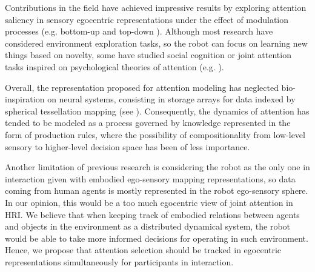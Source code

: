 \documentclass[letterpaper, 10 pt, conference]{ieeeconf}  %
\begin{document}

	Contributions in the field have achieved impressive results by exploring attention saliency in sensory egocentric representations under the effect of modulation processes (e.g. bottom-up \cite{ruesch2008} and top-down \cite{bodiroza2011}). Although most research have considered environment exploration tasks, so the robot can focus on learning new things based on novelty, some have studied social cognition or joint attention tasks inspired on psychological theories of attention (e.g. \cite{ruesch2008}). 
	
	Overall, the representation proposed for attention modeling has neglected bio-inspiration on neural systems, consisting in storage arrays for data indexed by spherical tessellation mapping (see \cite{peters2009sensory}). Consequently, the dynamics of attention has tended to be modeled as a process governed by knowledge represented in the form of production rules, where the possibility of compositionality from low-level sensory to higher-level decision space has been of less importance. 
	
	
	
	
	Another limitation of previous research is considering the robot as the only one in interaction given with embodied ego-sensory mapping representations, so data coming from human agents is mostly represented in the robot ego-sensory sphere. In our opinion, this would be a too much egocentric view of joint attention in HRI. We believe that when keeping track of embodied relations between agents and objects in the environment as a distributed dynamical system, the robot would be able to take more informed decisions for operating in such environment. Hence, we propose that attention selection should be tracked in egocentric representations simultaneously for participants in interaction. 
	 
\end{document}
